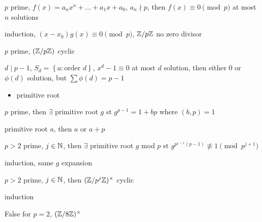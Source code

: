 \begin{thm}
    $p$ prime, $f(x) = a_n x^n + \dots + a_{1}x + a_0$, $a_n \nmid p$, then $f(x) \equiv 0 \pmod p$ at most $n$ solutions
\end{thm}
\begin{pf}
    induction, $(x - x_0)g(x) \equiv 0 \pmod{p}$, $\mathbb{Z}/p\mathbb{Z}$ no zero divisor
\end{pf}

\begin{thm}
    $p$ prime, $(\mathbb{Z}/p\mathbb{Z})$ cyclic
\end{thm}
\begin{pf}
    $d \mid p - 1$, $S_d = \left\{ a : \text{order } d \right\}$, $x^d - 1 \equiv 0$ at most $d$ solution, then either 0 or $\phi(d)$ solution, but $\sum \phi(d) = p-1$
\end{pf}

\begin{itemize}
    \item primitive root
\end{itemize}

\begin{lemma}
    $p$ prime, then $\exists$ primitive root $g$ st $g^{p-1} = 1 + bp$ where $(b, p) = 1$
\end{lemma}
\begin{pf}
    primitive root $a$, then $a$ or $a+p$
\end{pf}

\begin{lemma}
    $p > 2$ prime, $j \in \mathbb{N}$, then $\exists$ primitive root $g$ mod $p$ st $g^{p^{j-1}(p-1)} \not\equiv 1 \pmod{p^{j+1}}$
\end{lemma}
\begin{pf}
    induction, same $g$ expansion
\end{pf}

\begin{thm}
    $p > 2$ prime, $j \in \mathbb{N}$, then $(\mathbb{Z}/p^j\mathbb{Z})^\times$ cyclic
\end{thm}
\begin{pf}
    induction
\end{pf}

\begin{fact}
    False for $p = 2$, $(\mathbb{Z}/8\mathbb{Z})^\times$
\end{fact}


